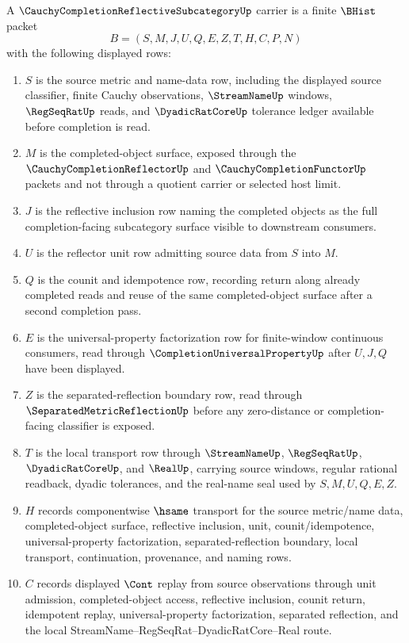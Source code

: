\begin{definition}
\label{def:cauchy-completion-reflective-subcategory-carrier}
A $\CauchyCompletionReflectiveSubcategoryUp$ carrier is a finite $\BHist$ packet
$$
B=(S,M,J,U,Q,E,Z,T,H,C,P,N)
$$
with the following displayed rows:
\begin{enumerate}
\item $S$ is the source metric and name-data row, including the displayed source classifier, finite Cauchy observations, $\StreamNameUp$ windows, $\RegSeqRatUp$ reads, and $\DyadicRatCoreUp$ tolerance ledger available before completion is read.
\item $M$ is the completed-object surface, exposed through the $\CauchyCompletionReflectorUp$ and $\CauchyCompletionFunctorUp$ packets and not through a quotient carrier or selected host limit.
\item $J$ is the reflective inclusion row naming the completed objects as the full completion-facing subcategory surface visible to downstream consumers.
\item $U$ is the reflector unit row admitting source data from $S$ into $M$.
\item $Q$ is the counit and idempotence row, recording return along already completed reads and reuse of the same completed-object surface after a second completion pass.
\item $E$ is the universal-property factorization row for finite-window continuous consumers, read through $\CompletionUniversalPropertyUp$ after $U,J,Q$ have been displayed.
\item $Z$ is the separated-reflection boundary row, read through $\SeparatedMetricReflectionUp$ before any zero-distance or completion-facing classifier is exposed.
\item $T$ is the local transport row through $\StreamNameUp$, $\RegSeqRatUp$, $\DyadicRatCoreUp$, and $\RealUp$, carrying source windows, regular rational readback, dyadic tolerances, and the real-name seal used by $S,M,U,Q,E,Z$.
\item $H$ records componentwise $\hsame$ transport for the source metric/name data, completed-object surface, reflective inclusion, unit, counit/idempotence, universal-property factorization, separated-reflection boundary, local transport, continuation, provenance, and naming rows.
\item $C$ records displayed $\Cont$ replay from source observations through unit admission, completed-object access, reflective inclusion, counit return, idempotent replay, universal-property factorization, separated reflection, and the local StreamName--RegSeqRat--DyadicRatCore--Real route.

\end{enumerate}
\end{definition}
